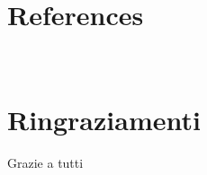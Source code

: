 \documentclass[12pt,a4paper,twoside]{book}
\begin{document}
\setcounter{chapter}{-1}
\raggedbottom

\pagestyle{plain}
\setcounter{page}{1}









\renewcommand{\bibsection}{}
\chapter*{References}

\newpage

\renewcommand{\appendixtocname}{Appendices}
{}

\newpage~\newpage
\chapter*{Ringraziamenti}
Grazie a tutti
\end{document}
